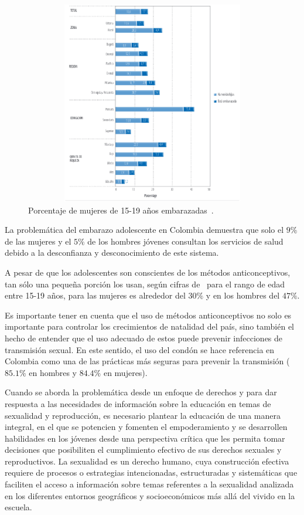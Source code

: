 \documentclass[a4paper]{article}
\begin{document}
\begin{figure}[t]
\centering
\includegraphics[width=6in,height=3.5in]{datos.eps}
\caption{Porcentaje de mujeres de 15-19 años embarazadas~\citep{Pro2015}.}
\label{fig:ends}
\end{figure}

La problemática del embarazo adolescente en Colombia demuestra que solo el $9\%$ de las mujeres y el $5\%$ de los hombres jóvenes consultan los servicios de salud debido a la desconfianza y desconocimiento de este sistema. 

A pesar de que los adolescentes son conscientes de los métodos anticonceptivos, tan sólo una pequeña porción los usan, según cifras de~\citep{Pro2015II} para el rango de edad entre 15-19 años, para las mujeres es alrededor del $30\%$ y en los hombres del $47\%$.

Es importante tener en cuenta que el uso de métodos anticonceptivos no solo es importante para controlar los crecimientos de natalidad del país, sino también el hecho de entender que el uso adecuado de estos puede prevenir infecciones de transmisión sexual. En este sentido, el uso del condón se hace referencia en Colombia como una de las prácticas más seguras para prevenir la transmisión ($85.1\%$ en hombres y $84.4\%$ en mujeres).

Cuando se aborda la problemática desde un enfoque de derechos y para dar respuesta a las necesidades de información sobre la educación en temas de sexualidad y reproducción, es necesario plantear la educación de una manera integral, en el que se potencien y fomenten el empoderamiento y se desarrollen habilidades en los jóvenes desde una perspectiva crítica que les permita tomar decisiones que posibiliten el cumplimiento efectivo de sus derechos sexuales y reproductivos. La sexualidad es un derecho humano, cuya construcción efectiva requiere de procesos o estrategias intencionadas, estructuradas y sistemáticas que faciliten el acceso a información sobre temas referentes a la sexualidad analizada en los diferentes entornos geográficos y socioeconómicos más allá del vivido en la escuela.
\end{document}
